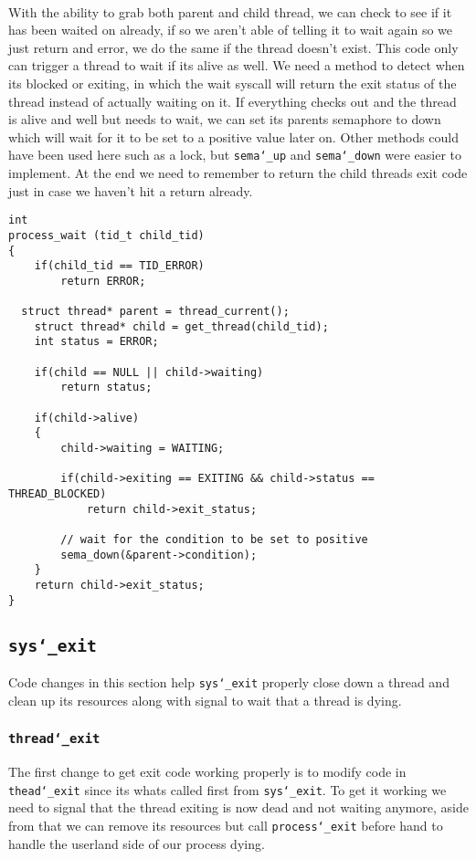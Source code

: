 \documentclass[]{article}
\begin{document}
 \newpage
 \textbf{}\\
 With the ability to grab both parent and child thread, we can check to see if it has been waited on already, if so we aren't able of telling it to wait again so we just return and error, we do the same if the thread doesn't exist. This code only can trigger a thread to wait if its alive as well. We need a method to detect when its blocked or exiting, in which the wait syscall will return the exit status of the thread instead of actually waiting on it. If everything checks out and the thread is alive and well but needs to wait, we can set its parents semaphore to down which will wait for it to be set to a positive value later on. Other methods could have been used here such as a lock, but \texttt{sema\char`_up} and \texttt{sema\char`_down} were easier to implement. At the end we need to remember to return the child threads exit code just in case we haven't hit a return already.
 
 \lstset{language=C, tabsize=2}  
 \begin{lstlisting} 
int
process_wait (tid_t child_tid) 
{
	if(child_tid == TID_ERROR)
		return ERROR;

  struct thread* parent = thread_current();
	struct thread* child = get_thread(child_tid);
	int status = ERROR;

	if(child == NULL || child->waiting)
		return status;
	
	if(child->alive)
	{
		child->waiting = WAITING;		
		
		if(child->exiting == EXITING && child->status == THREAD_BLOCKED)
			return child->exit_status;		

		// wait for the condition to be set to positive
		sema_down(&parent->condition);
	}
	return child->exit_status;
}
	 \end{lstlisting}
\newpage

 
 \subsection{\texttt{sys\char`_exit}}
 Code changes in this section help \texttt{sys\char`_exit} properly close down a thread and clean up its resources along with signal to wait that a thread is dying.

\subsubsection{\texttt{thread\char`_exit}}
The first change to get exit code working properly is to modify code in \texttt{thead\char`_exit} since its whats called first from \texttt{sys\char`_exit}. To get it working we need to signal that the thread exiting is now dead and not waiting anymore, aside from that we can remove its resources but call \texttt{process\char`_exit} before hand to handle the userland side of our process dying.
\end{document}
